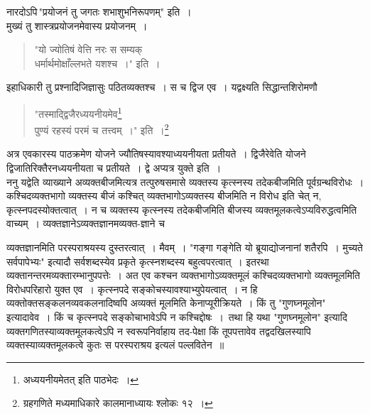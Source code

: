 \documentclass[11pt, openany]{book}
\begin{document}
{\qt नारदोऽपि\textendash \,"प्रयोजनं तु जगतः शभाशुभनिरूपणम्"} इति~। \\

\vspace{-3mm}
मुख्यं तु शास्त्रप्रयोजनमेवास्य प्रयोजनम्~। 

\begin{quote}
    {\qt
 "यो ज्योतिषं वेत्ति नरः स सम्यक् \\

\vspace{-7mm}
\hspace{0.5cm} धर्मार्थमोक्षाँल्लभते यशश्च~।"} इति~। 
\end{quote}

इहाधिकारी तु प्रश्नादिजिज्ञासुः पठितव्यक्तश्च~। स च द्विज एव~। यद्वक्ष्यति {\qt सिद्धान्तशिरोमणौ\textendash }

\begin{quote}
    {\qt
 "तस्माद्द्विजैरध्ययनीयमेव\renewcommand{\thefootnote}{$\dag$}\footnote{अध्ययनीयमेतत् इति पाठभेदः~। }\\
 
 \vspace{-7mm}
\hspace{0.5cm} पुण्यं रहस्यं परमं च तत्त्वम्~।"} इति~।\renewcommand{\thefootnote}{$\ddag$}\footnote{ग्रहगणिते मध्यमाधिकारे कालमानाध्यायः श्लोकः १२~।}
\end{quote}

 अत्र एवकारस्य पाठक्रमेण योजने ज्यौतिषस्यावश्याध्ययनीयता 
प्रतीयते~। द्विजैरेवेति योजने द्विजातिरिक्तैरनध्ययनीयता च प्रतीयते~। द्वे
अप्यत्र युक्ते इति~। \\

\vspace{-3mm}
 ननु यद्वेति व्याख्याने अव्यक्तबीजमित्यत्र तत्पुरुषसमासे व्यक्तस्य 
कृत्स्नस्य तदेकबीजमिति पूर्वग्रन्थविरोधः~। कश्चिदव्यक्तभागो व्यक्तस्य
बीजं 
कश्चित् व्यक्तभागोऽव्यक्तस्य बीजमिति न विरोध इति चेत् न,
कृत्स्नपदस्योक्तत्वात्~। न च व्यक्तस्य कृत्स्नस्य तदेकबीजमिति बीजस्य व्यक्तमूलकत्वेऽप्यविरुद्धत्वमिति वाच्यम्~। व्यक्तज्ञानेऽव्यक्तज्ञानमव्यक्त-ज्ञाने
च 

\newpage%

\noindent व्यक्तज्ञानमिति परस्पराश्रयस्य दुस्तरत्वात्~। मैवम्~। {\qt "गङ्गा गङ्गेति यो ब्रूयाद्योजनानां शतैरपि~। मुच्यते सर्वपापेभ्यः"} इत्यादौ सर्वशब्दस्येव
प्रकृते कृत्स्नशब्दस्य बहुत्वपरत्वात्~। इतरथा
व्यक्तानन्तरमव्यक्तारम्भानुपपत्तेः~। अत एव कश्चन व्यक्तभागोऽव्यक्तमूलं कश्चिदव्यक्तभागो 
व्यक्तमूलमिति विरोधपरिहारो युक्त एव~। कृत्स्नपदे
सङ्कोचस्यावश्याभ्युपेयत्वात्~। न हि व्यक्तोक्तसङ्कलनव्यवकलनादिष्वपि अव्यक्तं मूलमिति 
केनाप्यूरीक्रियते~। किं तु {\qt "गुणघ्नमूलोन"} इत्यादावेव~। किं च 
कृत्स्नपदे सङ्कोचाभावेऽपि न कश्चिद्दोषः~।~तथा हि यथा  {\qt "गुणघ्नमूलोन"} इत्यादि व्यक्तगणितस्याव्यक्तमूलकत्वेऽपि न स्वरूपनिर्वाहाय
तद-पेक्षा किं तूपपत्तावेव तद्वदखिलस्यापि व्यक्तस्याव्यक्तमूलकत्वे कुतः स
परस्पराश्रय इत्यलं पल्लवितेन~॥ \\
\end{document}
